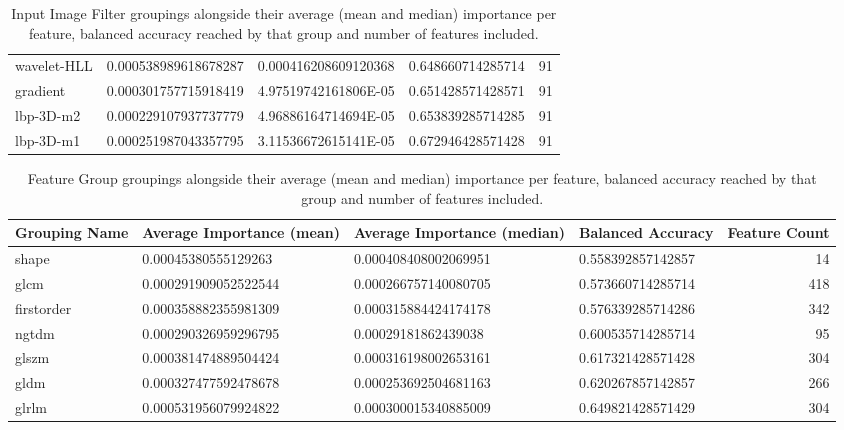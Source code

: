 \begin{table}[H]
\begin{xltabular}{\textwidth}{X l l l r}
    wavelet-HLL         & \num{0.000538989618678287} & \num{0.000416208609120368} & \num{0.648660714285714} & 91\\
    gradient            & \num{0.000301757715918419} & \num{4.97519742161806E-05} & \num{0.651428571428571} & 91\\
    lbp-3D-m2           & \num{0.000229107937737779} & \num{4.96886164714694E-05} & \num{0.653839285714285} & 91\\
    lbp-3D-m1           & \num{0.000251987043357795} & \num{3.11536672615141E-05} & \num{0.672946428571428} & 91\\
  \end{xltabular}
  \caption{Input Image Filter groupings alongside their average (mean and median) importance per feature, balanced accuracy reached by that group and number of features included.}\label{tbl:syn_input_image_filter}
\end{table}

\begin{table}[H]
  \tiny
  \begin{xltabular}{\textwidth}{X l l l r}
    Grouping Name & Average Importance (mean) & Average Importance (median) & Balanced Accuracy & Feature Count\\\hline\endhead
    shape         & \num{0.00045380555129263}       & \num{0.000408408002069951}        & \num{0.558392857142857} & 14\\
    glcm          & \num{0.000291909052522544}      & \num{0.000266757140080705}        & \num{0.573660714285714} & 418\\
    firstorder    & \num{0.000358882355981309}      & \num{0.000315884424174178}        & \num{0.576339285714286} & 342\\
    ngtdm         & \num{0.000290326959296795}      & \num{0.00029181862439038}         & \num{0.600535714285714} & 95\\
    glszm         & \num{0.000381474889504424}      & \num{0.000316198002653161}        & \num{0.617321428571428} & 304\\
    gldm          & \num{0.000327477592478678}      & \num{0.000253692504681163}        & \num{0.620267857142857} & 266\\
    glrlm         & \num{0.000531956079924822}      & \num{0.000300015340885009}        & \num{0.649821428571429} & 304\\    
  \end{xltabular}
  \caption{Feature Group groupings alongside their average (mean and median) importance per feature, balanced accuracy reached by that group and number of features included.}\label{tbl:syn_feature_group}
\end{table}

